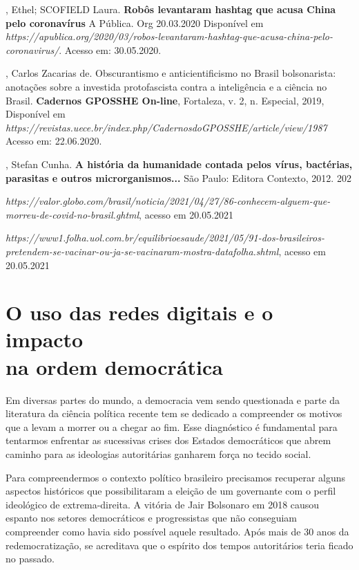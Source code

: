 \begin{bibliohedra}
, Ethel; SCOFIELD Laura. \textbf{Robôs levantaram hashtag que
acusa China pelo coronavírus} A Pública. Org 20.03.2020 Disponível em
\textit{https://apublica.org/2020/03/robos-levantaram-hashtag-que-acusa-china-pelo-coronavirus/}.
Acesso em: 30.05.2020.

, Carlos Zacarias de. Obscurantismo e anticientificismo no
Brasil bolsonarista: anotações sobre a investida protofascista contra a
inteligência e a ciência no Brasil. \textbf{Cadernos GPOSSHE On-line},
Fortaleza, v. 2, n. Especial, 2019, Disponível em
\textit{https://revistas.uece.br/index.php/CadernosdoGPOSSHE/article/view/1987}
Acesso em: 22.06.2020.

, Stefan Cunha. \textbf{A história da humanidade contada pelos
vírus, bactérias, parasitas e outros microrganismos...} São Paulo:
Editora Contexto, 2012. 202

\textit{https://valor.globo.com/brasil/noticia/2021/04/27/86-conhecem-alguem-que-morreu-de-covid-no-brasil.ghtml},
acesso em 20.05.2021

\textit{https://www1.folha.uol.com.br/equilibrioesaude/2021/05/91-dos-brasileiros-pretendem-se-vacinar-ou-ja-se-vacinaram-mostra-datafolha.shtml},
acesso em 20.05.2021
\end{bibliohedra}

\chapter{O uso das redes digitais e o impacto\\na ordem democrática}

Em diversas partes do mundo, a democracia vem sendo questionada e parte
da literatura da ciência política recente tem se dedicado a compreender
os motivos que a levam a morrer ou a chegar ao fim. Esse
diagnóstico é fundamental para tentarmos enfrentar as sucessivas crises
dos Estados democráticos que abrem caminho para as ideologias
autoritárias ganharem força no tecido social.

Para compreendermos o contexto político brasileiro precisamos recuperar
alguns aspectos históricos que possibilitaram a eleição de um governante
com o perfil ideológico de extrema-direita. A vitória de Jair Bolsonaro
em 2018 causou espanto nos setores democráticos e progressistas que não
conseguiam compreender como havia sido possível aquele resultado. Após
mais de 30 anos da redemocratização, se acreditava que o espírito dos
tempos autoritários teria ficado no passado.

